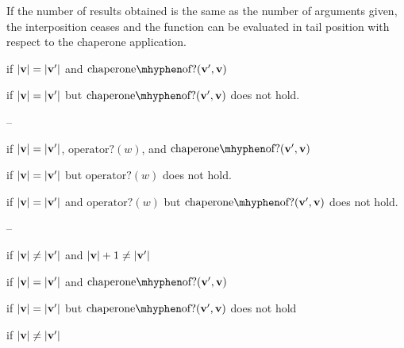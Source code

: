 \documentclass{sigplanconf}
\begin{document}
If the number of results obtained is the same as the number of arguments given, the interposition ceases and the function can be evaluated in tail position with respect to the chaperone application.

if $|\mathbf{v}|=|\mathbf{v'}|$ and $\mathrm{chaperone\mhyphen of?}(\vvp,\vv)$

if $|\mathbf{v}|=|\mathbf{v'}|$ but $\mathrm{chaperone\mhyphen of?}(\vvp,\vv)$ does not hold.

--

if $|\mathbf{v}|=|\mathbf{v'}|$, $\mathrm{operator?}(w)$, and $\mathrm{chaperone\mhyphen of?}(\vvp,\vv)$

if $|\mathbf{v}|=|\mathbf{v'}|$ but $\mathrm{operator?}(w)$ does not hold.

if $|\mathbf{v}|=|\mathbf{v'}|$ and $\mathrm{operator?}(w)$ but $\mathrm{chaperone\mhyphen of?}(\vvp,\vv)$ does not hold.

--

if $|\mathbf{v}|\ne|\mathbf{v'}|$ and $|\mathbf{v}|+1\ne|\mathbf{v'}|$







\red{\sval{\chacrk{\vv}::\ks}{\sigma}{\vvp}}{\sval{\ks}{\sigma}{\vvp}}
if $|\mathbf{v}|=|\mathbf{v'}|$ and $\mathrm{chaperone\mhyphen of?}(\vvp,\vv)$

if $|\mathbf{v}|=|\mathbf{v'}|$ but $\mathrm{chaperone\mhyphen of?}(\vvp,\vv)$ does not hold

if $|\mathbf{v}|\ne|\mathbf{v'}|$





\end{document}
